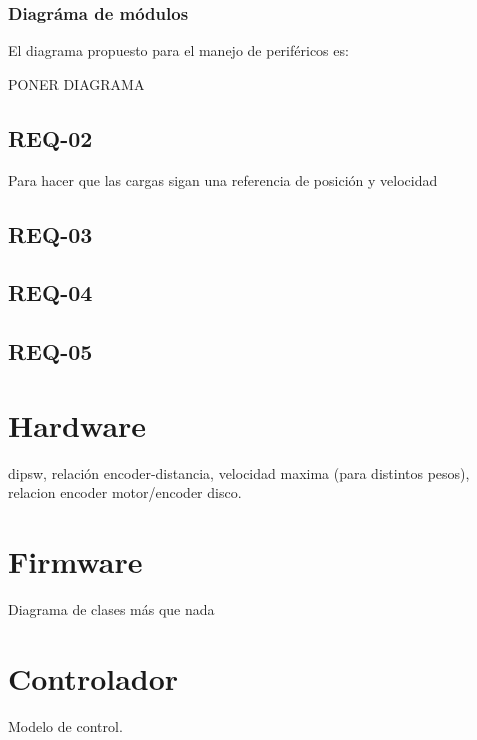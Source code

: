 \subsubsection{Diagráma de módulos}
El diagrama propuesto para el manejo de periféricos es:

\textcolor{FIXME}{PONER DIAGRAMA}


\subsection{REQ-02}
Para hacer que las cargas sigan una referencia de posición y velocidad 
\subsection{REQ-03}
\subsection{REQ-04}
\subsection{REQ-05}

\section{Hardware}


dipsw, relación encoder-distancia, velocidad maxima (para distintos pesos), relacion encoder motor/encoder disco.

\section{Firmware}
Diagrama de clases más que nada

\section{Controlador}
Modelo de control.
